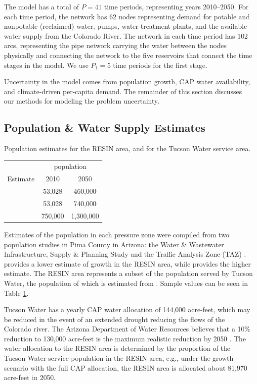 \documentclass[opre,nonblindrev]{informs3} %
\begin{document}
The model has a total of $P = 41$ time periods, representing years 2010--2050.
For each time period, the network has 62 nodes representing demand for potable and nonpotable (reclaimed) water, pumps, water treatment plants, and the available water supply from the Colorado River.
The network in each time period has 102 arcs, representing the pipe network carrying the water between the nodes physically and connecting the network to the five reservoirs that connect the time stages in the model.
We use $P_1 = 5$ time periods for the first stage.

Uncertainty in the model comes from population growth, CAP water availability, and climate-driven per-capita demand.
The remainder of this section discusses our methods for modeling the problem uncertainty.

\subsection{Population \& Water Supply Estimates}

\begin{table}
	\TABLE
	{
		Population estimates for the RESIN area, and for the Tucson Water service area.
		\label{tb:population}
	}
	{\begin{tabular}{lcc}
		\hline
		         & \multicolumn{2}{c}{population} \\
		Estimate & 2010 & 2050 \\
		\hline
		\cite{taz}    &  53,028 &   460,000 \\
		\cite{wisp}   &  53,028 &   740,000 \\
		\hline
		\cite{tucson} & 750,000 & 1,300,000 \\
		\hline
	\end{tabular}}
	{}
\end{table}

Estimates of the population in each pressure zone were compiled from two population studies in Pima County in Arizona: the Water \& Wastewater Infrastructure, Supply \& Planning Study \citep{wisp} and the Traffic Analysis Zone (TAZ) \citep{taz}.
\cite{taz} provides a lower estimate of growth in the RESIN area, while \cite{wisp} provides the higher estimate.
The RESIN area represents a subset of the population served by Tucson Water, the population of which is estimated from \cite{tucson}.
Sample values can be seen in Table \ref{tb:population}.

Tucson Water has a yearly CAP water allocation of 144,000 acre-feet, which may be reduced in the event of an extended drought reducing the flows of the Colorado river.
The Arizona Department of Water Resources believes that a 10\% reduction to 130,000 acre-feet is the maximum realistic reduction by 2050 \citep{scott2012scenario}.
The water allocation to the RESIN area is determined by the proportion of the Tucson Water service population in the RESIN area, e.g., under the \cite{wisp} growth scenario with the full CAP allocation, the RESIN area is allocated about 81,970 acre-feet in 2050.
\end{document}
